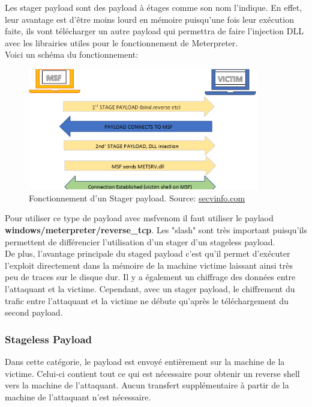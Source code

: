 Les stager payload sont des payload à étages comme son nom l'indique. En effet, leur avantage est d'être moins lourd en mémoire puisqu'une fois leur exécution faite, ils vont télécharger un autre payload qui permettra de faire l'injection DLL avec les librairies utiles pour le fonctionnement de Meterpreter.\\



\noindent Voici un schéma du fonctionnement:

\begin{figure}[htp!]
  \centering
  \setlength\figureheight{7cm}
  \setlength\figurewidth{9cm}
  \includegraphics[width=0.9\textwidth]{oui/images/Reverse_shell-meterpreter/stagepayload.png}
  \caption{Fonctionnement d'un Stager payload. Source: \url{secvinfo.com}}
  \label{fig:courbe-tikz}
\end{figure}


Pour utiliser ce type de payload avec msfvenom il faut utiliser le paylaod \textbf{windows/meterpreter/reverse\_tcp}. Les "slash" sont très important puisqu'ils permettent de différencier l'utilisation d'un stager d'un stageless payload.\\ De plus, l’avantage principale du staged payload c’est qu’il permet d’exécuter l’exploit directement dans la mémoire de la machine victime laissant ainsi très peu de traces sur le disque dur. Il y a également un chiffrage des données entre l'attaquant et la victime. Cependant, avec un stager payload, le chiffrement du trafic entre l’attaquant et la victime ne débute qu’après le téléchargement du second payload.

\subsubsection{Stageless Payload}

Dans cette catégorie, le payload est envoyé entièrement sur la machine de la victime. Celui-ci contient tout ce qui est nécessaire pour obtenir un reverse shell vers la machine de l’attaquant. Aucun transfert supplémentaire à partir de la machine de l’attaquant n’est nécessaire.\\

